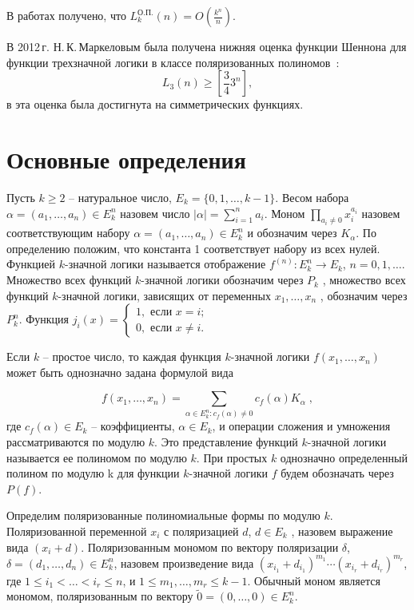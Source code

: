 \documentclass[bibliography=totoc, a4paper, 12pt]{extarticle}
\let\stdsection\section
\renewcommand\section{\newpage\stdsection}
\begin{document}
В работах \cite{sd08, bs14} получено, что
$L^{\text{О.П.}}_k(n) = O(\frac{k ^ n}{n})$.

В 2012\,г. Н.\,К.\,Маркеловым была получена нижняя оценка функции Шеннона для
функции трехзначной логики в классе поляризованных полиномов~\cite{mn12}:
$$
L_3(n) \geqslant \left[\frac{3}{4}3^n\right],
$$
в \cite{ss15} эта оценка была достигнута на симметрических функциях.

\section{Основные определения}

Пусть $k \geqslant 2$ -- натуральное число, $E_k = \{0, 1, \dots, k - 1\}$.
Весом набора $\alpha = (a_1, \dots, a_n ) \in E_k^n$ назовем число $|\alpha| =
\sum\limits_{i=1}^n a_i$. Моном $\prod\limits_{a_i\neq0}x_i^{a_i}$ назовем
соответствующим набору $\alpha = (a_1, \dots, a_n ) \in E_k^n$ и обозначим через
$K_{\alpha}$. По определению положим, что константа 1 соответствует набору из
всех нулей. Функцией $k$\nobreakdash-значной логики называется отображение
$f^{(n)} : E_k^n \rightarrow E_k$, $n = 0, 1, \dots$. Множество всех функций
$k$-значной логики обозначим через $P_k$ , множество всех функций $k$-значной
логики, зависящих от переменных $x_1, \dots, x_n$ , обозначим через $P_k^n$.
Функция $j_i(x) = \begin{cases} 1, \text{ если } x = i; \\ 0, \text{ если } x
\neq i. \end{cases}$

Если $k$ -- простое число, то каждая функция $k$\nobreakdash-значной логики
$f(x_1 , \dots , x_n)$ может быть однозначно задана формулой вида

$$ f(x_1, \dots, x_n) = \sum_{\alpha \in E_k^n:c_f(\alpha) \neq
0}c_f(\alpha)K_\alpha \; ,$$ где $c_f(\alpha) \in E_k$ -- коэффициенты, $\alpha
\in E_k$, и операции сложения и умножения рассматриваются по модулю $k$. Это
представление функций $k$\nobreakdash-значной логики называется ее полиномом по
модулю $k$. При простых $k$ однозначно определенный полином по модулю k для
функции $k$\nobreakdash-значной логики $f$ будем обозначать через $P(f)$.

Определим поляризованные полиномиальные формы по модулю $k$. Поляризованной
переменной $x_i$ с поляризацией $d$, $d \in E_k$ , назовем выражение вида $(x_i+
d)$. Поляризованным мономом по вектору поляризации $\delta$, $\delta = (d_1,
\dots, d_n) \in E_k^n$, назовем произведение вида $(x_{i_1} + d_{i_1}
)^{m_1}\cdots(x_{i_r} + d_{i_r})^{m_r}$, где $1 \leqslant i_1 < \ldots < i_r
\leqslant n$, и $1 \leqslant m_1 , \dots , m_r \leqslant k - 1$. Обычный моном
является мономом, поляризованным по вектору $\tilde{0} = (0, \dots, 0) \in
E_k^n$.
\end{document}

